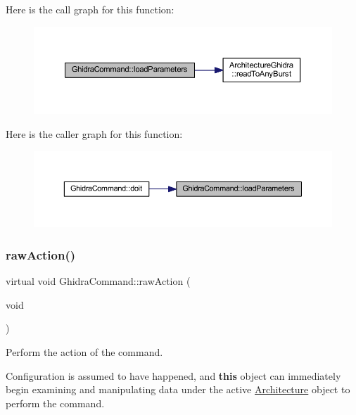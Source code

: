 Here is the call graph for this function\+:
\nopagebreak
\begin{figure}[H]
\begin{center}
\leavevmode
\includegraphics[width=350pt]{class_ghidra_command_a3e92d63544a9e5a36f27f6c3b177b28a_cgraph}
\end{center}
\end{figure}
Here is the caller graph for this function\+:
\nopagebreak
\begin{figure}[H]
\begin{center}
\leavevmode
\includegraphics[width=350pt]{class_ghidra_command_a3e92d63544a9e5a36f27f6c3b177b28a_icgraph}
\end{center}
\end{figure}
\mbox{\label{class_ghidra_command_a7d1a5cfedfd8f1d05161d27627302716}} 
\subsubsection{\texorpdfstring{rawAction()}{rawAction()}}
{\footnotesize\ttfamily virtual void Ghidra\+Command\+::raw\+Action (\begin{DoxyParamCaption}\item[{void}]{ }\end{DoxyParamCaption})\hspace{0.3cm}{\ttfamily [pure virtual]}}



Perform the action of the command. 

Configuration is assumed to have happened, and {\bfseries{this}} object can immediately begin examining and manipulating data under the active \mbox{\hyperlink{class_architecture}{Architecture}} object to perform the command. 

